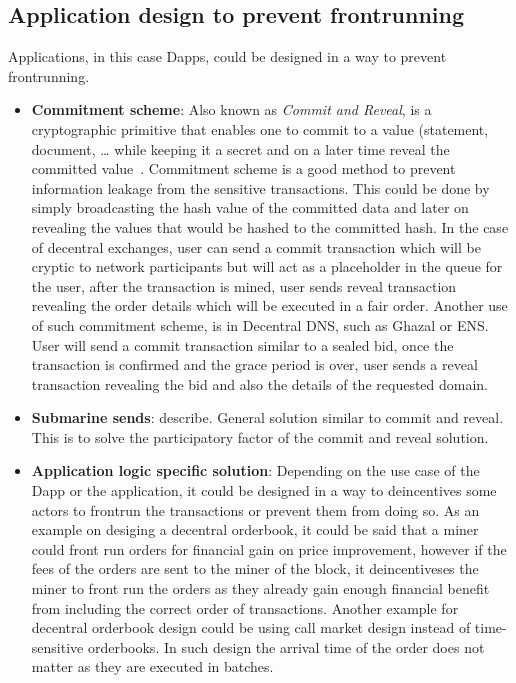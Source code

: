 \subsection{Application design to prevent frontrunning}
Applications, in this case Dapps, could be designed in a way to prevent frontrunning.

\begin{itemize}
\item{\textbf{Commitment scheme}: Also known as \textit{Commit and Reveal}, is a cryptographic primitive that enables one to commit to a value (\eg statement, document, \dots} while keeping it a secret and on a later time reveal the committed value~\cite{brassard1988minimum}. Commitment scheme is a good method to prevent information leakage from the sensitive transactions. This could be done by simply broadcasting the hash value of the committed data and later on revealing the values that would be hashed to the committed hash. 
In the case of decentral exchanges, user can send a commit transaction which will be cryptic to network participants but will act as a placeholder in the queue for the user, after the transaction is mined, user sends reveal transaction revealing the order details which will be executed in a fair order. Another use of such commitment scheme, is in Decentral DNS, such as Ghazal or ENS. User will send a commit transaction similar to a sealed bid, once the transaction is confirmed and the grace period is over, user sends a reveal transaction revealing the bid and also the details of the requested domain.





\item{\textbf{Submarine sends}: describe. General solution similar to commit and reveal. This is to solve the participatory factor of the commit and reveal solution.}

\item{\textbf{Application logic specific solution}: Depending on the use case of  the Dapp or the application, it could be designed in a way to deincentives some actors to frontrun the transactions or prevent them from doing so. As an example on desiging a decentral orderbook, it could be said that a miner could front run orders for financial gain on price improvement, however if the fees of the orders are sent to the miner of the block, it deincentiveses the miner to front run the orders as they already gain enough financial benefit from including the correct order of transactions. 
Another example for decentral orderbook design could be using call market design instead of  time-sensitive orderbooks. In such design the arrival time of the order does not matter as they are executed in batches. }


\end{itemize}



